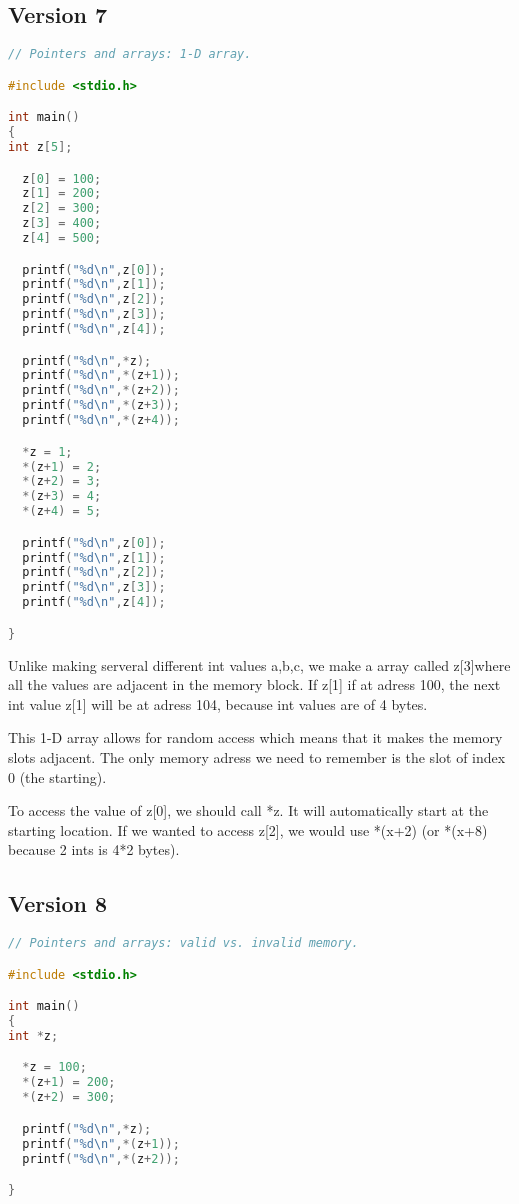 \documentclass{article}
\begin{document}
    \subsection*{Version 7}

    \begin{lstlisting}[language=C]
// Pointers and arrays: 1-D array.

#include <stdio.h>

int main()
{
int z[5];

  z[0] = 100;
  z[1] = 200;
  z[2] = 300;
  z[3] = 400;
  z[4] = 500;

  printf("%d\n",z[0]);
  printf("%d\n",z[1]);
  printf("%d\n",z[2]);
  printf("%d\n",z[3]);
  printf("%d\n",z[4]);

  printf("%d\n",*z);
  printf("%d\n",*(z+1));
  printf("%d\n",*(z+2));
  printf("%d\n",*(z+3));
  printf("%d\n",*(z+4));

  *z = 1;
  *(z+1) = 2;
  *(z+2) = 3;
  *(z+3) = 4;
  *(z+4) = 5;

  printf("%d\n",z[0]);
  printf("%d\n",z[1]);
  printf("%d\n",z[2]);
  printf("%d\n",z[3]);
  printf("%d\n",z[4]);

}
    \end{lstlisting}

Unlike making serveral different int values a,b,c, we make a array called z[3]where all the values are adjacent in the memory block. If z[1] if at adress 100, the next int value z[1] will be at adress 104, because int values are of 4 bytes.

This 1-D array allows for random access which means that it makes the memory slots adjacent. The only memory adress we need to remember is the slot of index 0 (the starting).

To access the value of z[0], we should call *z. It will automatically start at the starting location. If we wanted to access z[2], we would use *(x+2) (or *(x+8) because 2 ints is 4*2 bytes).

\subsection*{Version 8}

\begin{lstlisting}[language=C]
// Pointers and arrays: valid vs. invalid memory.

#include <stdio.h>

int main()
{
int *z;

  *z = 100;
  *(z+1) = 200;
  *(z+2) = 300;

  printf("%d\n",*z);
  printf("%d\n",*(z+1));
  printf("%d\n",*(z+2));

}
\end{lstlisting}
\end{document}
